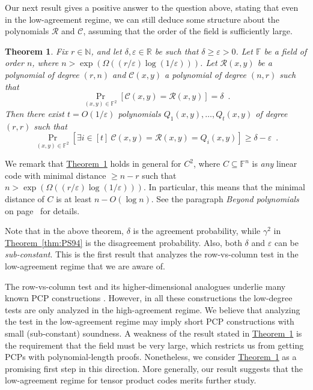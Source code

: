 \documentclass[11pt]{article}
\numberwithin{equation}{section}
\theoremstyle{definition}
\theoremstyle{plain}
\newcommand{\expref}[2]{\hyperref[#2]{#1~\ref{#2}}}
\theoremstyle{plain}
\newtheorem{ftheorem}[theorem]{Theorem}
\newcommand{\colored}{}
\newcommand{\blocklength}{\colored{n}} %
\newcommand{\Field}{\colored{\mathbb F}}
\newcommand{\degree}{\colored{r}}
\newcommand{\rowpoly}{\colored{\mathcal R}}
\newcommand{\colpoly}{\colored{\mathcal C}}
\newcommand{\prox}{\colored{\delta}}
\newcommand{\PSprox}{\colored{\gamma}}
\newcommand{\eps}{\varepsilon}
\newcommand{\Naturals}{\mathbb{N}}
\begin{document}
Our next result gives a positive answer to the question above, stating that even in the low-agreement regime, we can still deduce some structure about the polynomials $\rowpoly$ and $\colpoly$, assuming that the
%
order of the field  %
is sufficiently large.

\begin{ftheorem}
\label{thm:bivar-low-agreement}
Fix $\degree \in \Naturals$, and let $\prox, \eps \in \mathbb R$ be such that $\prox \geq \eps > 0$. Let $\Field$ be a field of
%
order  %
$\blocklength$, where $\blocklength > \exp(\Omega(({\degree}/{\eps}) \log({1}/{\eps})))$. Let $\rowpoly(x,y)$ be a polynomial of degree $(\degree,\blocklength)$ and $\colpoly(x,y)$ a polynomial of degree $(\blocklength,\degree)$ such that
\begin{equation*}
\Pr_{(x,y) \in \Field^2}[\colpoly(x,y) = \rowpoly(x,y)] = \prox \enspace.
\end{equation*}
Then there exist $t = O({1}/{\eps})$ polynomials $Q_1(x,y),\dots,Q_t(x,y)$ of degree $(\degree,\degree)$ such that
\begin{equation*}
\Pr_{(x,y) \in \Field^2}
[\exists i \in [t] \ \colpoly(x,y) = \rowpoly(x,y)= Q_i(x,y)]
\geq \prox - \eps \enspace.
\end{equation*}

\end{ftheorem}

We remark that \expref{Theorem}{thm:bivar-low-agreement} holds in general
%
%
for $C^2$, where $C \subseteq \Field^{\blocklength}$ is \emph{any} linear code      %
with minimal distance $\geq \blocklength-\degree$ such that
$\blocklength > \exp(\Omega(({\degree}/{\eps}) \log({1}/{\eps})))$.
In particular, this means that the minimal distance of $C$ is at least $\blocklength - O(\log \blocklength)$.
See the paragraph \emph{Beyond polynomials} on page~\pageref{par:beyondpoly} for details.

Note that in the above theorem, $\prox$ is the agreement probability, while $\PSprox^{2}$ in \expref{Theorem}{thm:PS94} is the disagreement probability. Also, both $\prox$ and $\eps$ can be \emph{sub-constant}. This is the first result that analyzes the row-vs-column test
%
in the low-agreement regime that we are aware of.              %

The row-vs-column test and its higher-dimensional analogues underlie many known PCP constructions \cite{BabaiFL91, BabaiFLS91, PolishchukS94, BenSassonS08}.
However, in all these constructions the
%
low-degree tests are only analyzed in the
%
high-agreement regime.   %
We believe that analyzing the test in the low-agreement regime may imply short PCP constructions with small (sub-constant) soundness.
A weakness of the result stated in \expref{Theorem}{thm:bivar-low-agreement} is the requirement that the field
%
must be very large,
which restricts us from getting PCPs with
%
polynomial-length proofs.  %
Nonetheless, we consider \expref{Theorem}{thm:bivar-low-agreement} as a promising first step in this direction.
More generally, our result suggests that the low-agreement regime for tensor product codes merits further study.
\end{document}
